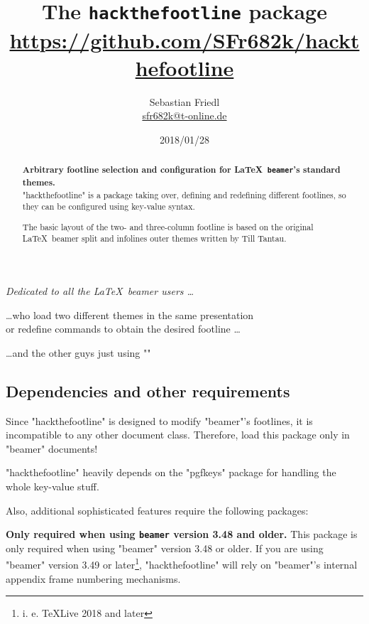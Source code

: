 \documentclass[11pt]{ltxdoc}
\title{The \texttt{\bfseries hackthefootline} package \\ {\large\url{https://github.com/SFr682k/hackthefootline}}}
\author{Sebastian Friedl \\ \href{mailto:sfr682k@t-online.de}{\ttfamily sfr682k@t-online.de}}
\date{2018/01/28}
\begin{document}
	\maketitle
	\thispagestyle{empty}
	
	\begin{center} \itshape
		Dedicated to all the \LaTeX\ beamer users \dots
		
		\medskip
		\dots who load two different themes in the same presentation \\ or redefine commands to obtain the desired footline \dots
		
		\medskip
		\dots and the other guys just using "\setbeamertemplate"
	\end{center}
	
	\medskip
	\begin{abstract}
		\parindent0pt\noindent%
		\textbf{Arbitrary footline selection and configuration for \LaTeX\ \texttt{beamer}'s standard themes.} \\
		"hackthefootline" is a package taking over, defining and redefining different footlines, so they can be configured using key-value syntax.
		
		\smallskip
		The basic layout of the two- and three-column footline is based on the original \LaTeX\ beamer split and infolines outer themes written by Till Tantau.
	\end{abstract}
	
	
	\tableofcontents
	
	\clearpage
	
	
	
	\subsection*{Dependencies and other requirements}
	Since "hackthefootline" is designed to modify "beamer"'s footlines, it is incompatible to any other document class. Therefore, load this package only in "beamer" documents!
	
	\medskip
	"hackthefootline" heavily depends on the "pgfkeys" package for handling the whole key-value stuff.
	
	\bigskip
	Also, additional sophisticated features require the following packages:
	
	\medskip
	\textbf{Only required when using \texttt{beamer} version 3.48 and older.}
	This package is only required when using "beamer" version 3.48 or older. If you are using "beamer" version 3.49 or later\footnote{i. e. \TeX{}Live 2018 and later}, "hackthefootline" will rely on "beamer"'s internal appendix frame numbering mechanisms.
	
\end{document}
